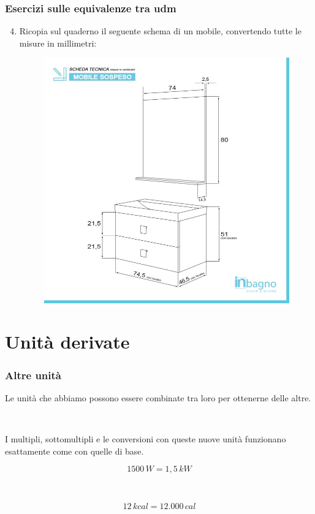 \documentclass[handout]{beamer}
\theoremstyle{plain}
\begin{document}
\begin{frame}
\frametitle{Esercizi sulle equivalenze tra udm}
\begin{enumerate}\setcounter{enumi}{3}
  \item Ricopia sul quaderno il seguente schema di un mobile, convertendo tutte le misure in millimetri:
  \begin{figure}
    \includegraphics[width=.6\columnwidth]{img/mobile.jpg}
  \end{figure}
\end{enumerate}
\end{frame}









\section{Unità derivate}


\begin{frame}
\frametitle{Altre unità}
Le unità che abbiamo possono essere \alert{combinate tra loro} per ottenerne delle altre.\pause

~

I multipli, sottomultipli e le conversioni con queste nuove unità funzionano \alert{esattamente come con quelle di base}.

\[ 1500 \, W = 1,5 \, kW \]

~

\[ 12 \, kcal = 12.000 \, cal\]
\end{frame}
\end{document}
